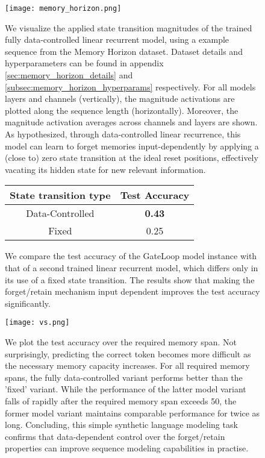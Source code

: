 \documentclass{article} \usepackage{iclr2024_conference,times}
\begin{document}
\begin{figure}[H]
    \begin{center}
        \texttt{[image: memory\_horizon.png]}
    \end{center}
    \caption{We visualize the applied state transition magnitudes of the trained fully data-controlled linear recurrent model, using a example sequence from the Memory Horizon dataset. Dataset details and hyperparameters can be found in appendix \ref{sec:memory_horizon_details} and \ref{subsec:memory_horizon_hyperparams} respectively. For all models layers and channels (vertically), the magnitude activations are plotted along the sequence length (horizontally). Moreover, the magnitude activation averages across channels and layers are shown. As hypothesized, through data-controlled linear recurrence, this model can learn to forget memories input-dependently by applying a (close to) zero state transition at the ideal reset positions, effectively vacating its hidden state for new relevant information.}
\end{figure}



\begin{figure}[H]
    \centering
    \begin{tabular}{cc}
        \toprule
        State transition type & Test Accuracy \\ 
        \midrule
        Data-Controlled & \textbf{0.43} \\ 
        Fixed & 0.25 \\ 
        \bottomrule
    \end{tabular}
    \caption{We compare the test accuracy of the GateLoop model instance with that of a second trained linear recurrent model, which differs only in its use of a fixed state transition. The results show that making the forget/retain mechanism input dependent improves the test accuracy significantly.}
    \label{fig:test_accuracy_table}
\end{figure}

\begin{figure}[H]
    \centering
    \texttt{[image: vs.png]}
    \caption{We plot the test accuracy over the required memory span. Not surprisingly, predicting the correct token becomes more difficult as the necessary memory capacity increases. For all required memory spans, the fully data-controlled variant performs better than the 'fixed' variant. While the performance of the latter model variant falls of rapidly after the required memory span exceeds 50, the former model variant maintains comparable performance for twice as long. Concluding, this simple synthetic language modeling task confirms that data-dependent control over the forget/retain properties can improve sequence modeling capabilities in practise.}
    \label{fig:accuracy_memory_span}
\end{figure}
\end{document}
